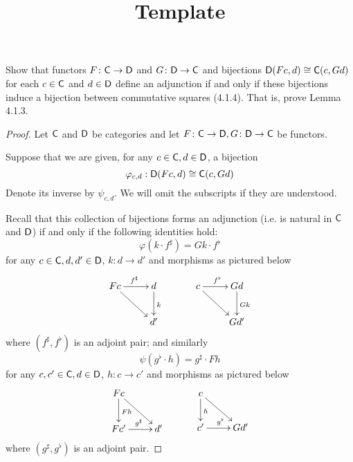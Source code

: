 \documentclass[../../solutions]{subfiles}
\title{Template}
\author{}
\begin{document}
\maketitle

%   

\begin{exercise}
Show that functors ${F}\colon{\mathsf{C}}\to{\mathsf{D}}$ and ${G}\colon{\mathsf{D}}\to{\mathsf{C}}$ and bijections $\mathsf{D}(Fc, d) \cong \mathsf{C}(c, Gd)$ for each $c \in \mathsf{C}$ and $d \in \mathsf{D}$ define an adjunction if and only if these bijections induce a bijection between commutative squares (4.1.4). That is, prove Lemma 4.1.3.
\end{exercise}

\begin{proof}

Let $\mathsf{C}$ and $\mathsf{D}$ be categories and let ${F}\colon{\mathsf{C}}\to{\mathsf{D}} , {G}\colon{\mathsf{D}}\to{\mathsf{C}}$ be functors.

Suppose that we are given, for any $c\in \mathsf{C}, d \in \mathsf{D}$, a bijection \[ \varphi_{c,d}: \mathsf{D}(Fc, d) \cong \mathsf{C}(c, Gd) \]
Denote its inverse by $\psi_{c,d}$. We will omit the subscripts if they are understood.

Recall that this collection of bijections forms an adjunction (i.e. is natural in $\mathsf{C}$ and $\mathsf{D}$) if and only if the following identities hold:
\begin{equation} \label{4-1-1-adj1}
\varphi(k\cdot f^\sharp) = Gk \cdot f^\flat
\end{equation}
for any $c \in \mathsf{C}, d, d' \in \mathsf{D}$, $k : d\to d'$ and morphisms as pictured below
\[
\xymatrix{
 Fc\ar[dr] \ar[r]^{f^\sharp} & d \ar[d]^{k}\\
  & d'
} \ \ \ \ \ \ \ \ \ 
\xymatrix{
 c\ar[dr] \ar[r]^{f^\flat} & Gd \ar[d]^{Gk}\\
 & Gd'
} 
\]
where $(f^\sharp, f^\flat)$ is an adjoint pair; and similarly
\begin{equation} \label{4-1-1-adj2}
\psi(g^\flat \cdot h) = g^\sharp \cdot Fh
\end{equation}
for any $c,c'\in \mathsf{C}, d \in \mathsf{D}$, $h : c \to c'$ and morphisms as pictured below
\[
\xymatrix{
 Fc\ar[d]^{Fh} \ar[dr] & \\
 Fc'\ar[r]^{g^\sharp} & d'
} \ \ \ \ \ \ \ \ \ 
\xymatrix{
 c\ar[d]^{h} \ar[dr] & \\
 c'\ar[r]^{g^\flat} & Gd'
} 
\]
where $(g^\sharp, g^\flat)$ is an adjoint pair.


\end{proof}
\end{document}
